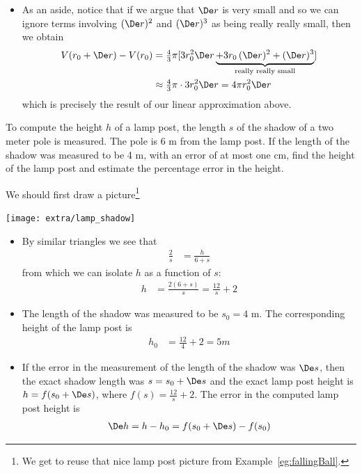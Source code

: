 \begin{eg}
\begin{itemize}
\item As an aside, notice that if we argue that $\De r$ is very small and so we
can ignore terms involving $(\De r)^2$ and $(\De r)^3$ as being really really
small, then we obtain
\begin{align*}
V(r_0+\De r)-V(r_0)
&=\tfrac{4}{3}\pi[3r_0^2\De r \underbrace{+3r_0\,(\De r)^2+(\De
r)^3}_\text{really
really small}]\\
&\approx \tfrac{4}{3}\pi \cdot 3r_0^2\De r  = 4 \pi r_0^2 \De r
\end{align*}
which is precisely the result of our linear approximation above.


\end{itemize}
\end{eg}
\goodbreak

\begin{eg}\label{eg:taylorLamp}
To compute the height $h$ of a lamp post, the length $s$ of the
shadow of a two meter pole is measured. The pole is 6 m from the lamp post.
If the length of the shadow was measured to be 4 m, with an error of
at most one cm, find the height of the lamp post and estimate the
percentage error in the height.

\soln We should first draw a picture\footnote{We get to reuse that nice lamp post picture
from Example~\ref{eg:fallingBall}.}
\begin{efig}
 \begin{center}
  \texttt{[image: extra/lamp\_shadow]}
 \end{center}
\end{efig}
\begin{itemize}
\item By similar triangles we see that
\begin{align*}
    \frac{2}{s} &= \frac{h}{6+s}
\end{align*}
from which we can isolate $h$ as a function of $s$:
\begin{align*}
  h &= \frac{2(6+s)}{s} = \frac{12}{s} + 2
\end{align*}
\item The length of the shadow was measured to be $s_0=4$ m. The corresponding
height of the lamp post is
\begin{align*}
  h_0 &= \frac{12}{4} + 2 = 5m
\end{align*}

\item If the error in the measurement of the length of the shadow was $\De s$, then the
exact shadow length was $s=s_0+\De s$ and the exact lamp post height is $h=f(s_0+\De s)$,
where $f(s)=\tfrac{12}{s}+2$. The error in the computed lamp post height is
\begin{align*}
  \De h=h-h_0=f(s_0+\De s)-f(s_0)
\end{align*}


\end{itemize}
\end{eg}
